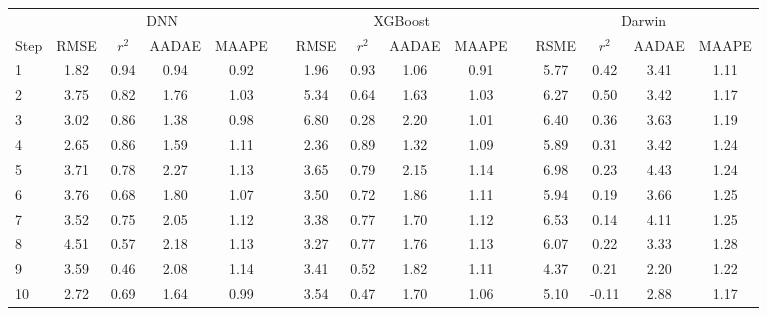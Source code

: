 \documentclass[]{interact}
\theoremstyle{plain}%
\theoremstyle{definition}
\theoremstyle{remark}
\begin{document}
\begin{table}[H]
{\begin{tabular}{lcccccccccccccc} \toprule
&  \multicolumn{4}{c}{DNN}  & \multicolumn{1}{c}{\quad} &  \multicolumn{4}{c}{XGBoost} & \multicolumn{1}{c}{\quad} &  \multicolumn{4}{c}{Darwin}\\ \cmidrule{2-15}
Step  &  RMSE  &  $r^2$  &  AADAE  & MAAPE & \quad &  RMSE  &  $r^2$  &  AADAE & MAAPE & \quad & RSME &  $r^2$  &  AADAE & MAAPE\\ \midrule
1 &  1.82 & 0.94 & 0.94 & 0.92 & \quad & 1.96 & 0.93 & 1.06 & 0.91 & \quad & 5.77 & 0.42 & 3.41 & 1.11\\
2 &  3.75 & 0.82 & 1.76 & 1.03 & \quad & 5.34 & 0.64 & 1.63 & 1.03 & \quad & 6.27 & 0.50 & 3.42 & 1.17\\
3 &  3.02 & 0.86 & 1.38 & 0.98 & \quad & 6.80 & 0.28 & 2.20 & 1.01 & \quad & 6.40 & 0.36 & 3.63 & 1.19\\
4 &  2.65 & 0.86 & 1.59 & 1.11 & \quad & 2.36 & 0.89 & 1.32 & 1.09 & \quad & 5.89 & 0.31 & 3.42 & 1.24\\
5 &  3.71 & 0.78 & 2.27 & 1.13 & \quad & 3.65 & 0.79 & 2.15 & 1.14 & \quad & 6.98 & 0.23 & 4.43 & 1.24\\
6 &  3.76 & 0.68 & 1.80 & 1.07 & \quad & 3.50 & 0.72 & 1.86 & 1.11 & \quad & 5.94 & 0.19 & 3.66 & 1.25\\
7 &  3.52 & 0.75 & 2.05 & 1.12 & \quad & 3.38 & 0.77 & 1.70 & 1.12 & \quad & 6.53 & 0.14 & 4.11 & 1.25\\
8 &  4.51 & 0.57 & 2.18 & 1.13 & \quad & 3.27 & 0.77 & 1.76 & 1.13 & \quad & 6.07 & 0.22 & 3.33 & 1.28\\
9 &  3.59 & 0.46 & 2.08 & 1.14 & \quad & 3.41 & 0.52 & 1.82 & 1.11 & \quad & 4.37 & 0.21 & 2.20 & 1.22\\
10 &  2.72 & 0.69 & 1.64 & 0.99& \quad & 3.54 & 0.47 & 1.70 & 1.06 & \quad & 5.10 & -0.11 & 2.88 & 1.17\\
 \bottomrule
\end{tabular}}
\label{DepartureDeviationPredictionVSDarwin}
\end{table}
\end{document}
